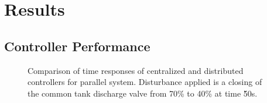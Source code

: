 \chapter{Results}
\label{sec:results}
\section{Controller Performance}

\begin{figure}[]
  \begin{subfigure}{0.48\linewidth}
    \footnotesize
    
    \normalsize
  \end{subfigure}
  \hfill
  \begin{subfigure}{0.48\linewidth}
    \footnotesize
    
    \normalsize
  \end{subfigure}
  
  \caption{Comparison of time responses of centralized and distributed controllers for parallel system. Disturbance applied is a closing of the common tank discharge valve from 70\% to 40\% at time \u{50}{s}.}
  \label{fig:res:parallel_timeresp}
\end{figure}

